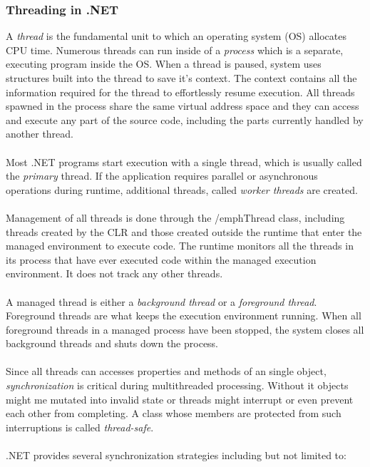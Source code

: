 \subsubsection{Threading in .NET}
A \emph{thread} is the fundamental unit to which an operating system (OS) allocates CPU time. Numerous threads can run inside of a \emph{process} which is a separate, executing program inside the OS.
When a thread is paused, system uses structures built into the thread to save it's context. The context contains all the information required for the thread to effortlessly resume execution. All threads spawned in the process share the same virtual address space and they can access and execute any part of the source code, including the parts currently handled by another thread. 
\\ \\ 
Most .NET programs start execution with a single thread, which is usually called the \emph{primary} thread. If the application requires parallel or asynchronous operations during runtime, additional threads, called \emph{worker threads} are created.
\\ \\ 
Management of all threads is done through the /emph{Thread} class, including threads created by the CLR and those created outside the runtime that enter the managed environment to execute code. The runtime monitors all the threads in its process that have ever executed code within the managed execution environment. It does not track any other threads.
\\ \\ 
A managed thread is either a \emph{background thread} or a \emph{foreground thread}. Foreground threads are what keeps the execution environment running. When all foreground threads in a managed process have been stopped, the system closes all background threads and shuts down the process.
\\ \\ 
Since all threads can accesses properties and methods of an single object, \emph{synchronization} is critical during multithreaded processing. Without it objects might me mutated into invalid state or threads might interrupt or even prevent each other from completing. A class whose members are protected from such interruptions is called \emph{thread-safe}. \cite{ManagedThreading} 
\\ \\ 
.NET provides several synchronization strategies including but not limited to:

